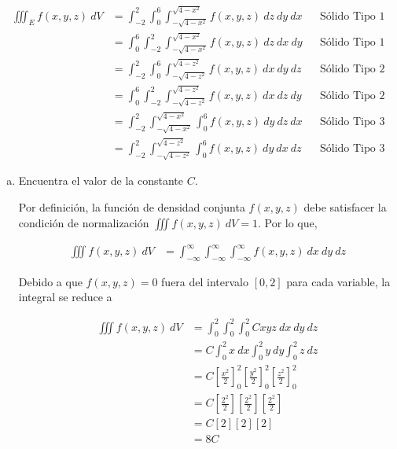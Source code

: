 \documentclass[12pt]{exam}
\begin{document}
\begin{questions}
  \begin{align*}
    \iiint_E f(x,y,z) ~ dV
    &= \int_{-2}^2 \int_0^6 \int_{-\sqrt{4-x^2}}^{\sqrt{4-x^2}} f(x,y,z) ~ dz ~ dy ~ dx  && \text{Sólido Tipo 1} \\
    &= \int_0^6 \int_{-2}^2 \int_{-\sqrt{4-x^2}}^{\sqrt{4-x^2}} f(x,y,z) ~ dz ~ dx ~ dy  && \text{Sólido Tipo 1} \\
    &= \int_{-2}^2 \int_0^6 \int_{-\sqrt{4-z^2}}^{\sqrt{4-z^2}} f(x,y,z) ~ dx ~ dy ~ dz  && \text{Sólido Tipo 2} \\
    &= \int_0^6 \int_{-2}^2 \int_{-\sqrt{4-z^2}}^{\sqrt{4-z^2}} f(x,y,z) ~ dx ~ dz ~ dy  && \text{Sólido Tipo 2} \\
    &= \int_{-2}^2 \int_{-\sqrt{4-x^2}}^{\sqrt{4-x^2}} \int_0^6  f(x,y,z) ~ dy ~ dz ~ dx  && \text{Sólido Tipo 3} \\
    &= \int_{-2}^2 \int_{-\sqrt{4-z^2}}^{\sqrt{4-z^2}} \int_0^6 f(x,y,z) ~ dy ~ dx ~ dz  && \text{Sólido Tipo 3}
  \end{align*}


  \begin{enumerate}[(a)]
  \item Encuentra el valor de la constante $C$.

    Por definición, la función de densidad conjunta $f(x,y,z)$ debe satisfacer la condición de normalización $\iiint f(x,y,z) ~ dV = 1$. Por lo que,

    \begin{align*}
      \iiint f(x,y,z) ~ dV
      &= \int_{-\infty}^{\infty} \int_{-\infty}^{\infty} \int_{-\infty}^{\infty} f(x,y,z) ~ dx ~ dy ~ dz 
    \end{align*}

    Debido a que $f(x,y,z) = 0$ fuera del intervalo $[0,2]$ para cada variable, la integral se reduce a

    \begin{align*}
      \iiint f(x,y,z) ~ dV
      &= \int_0^2 \int_0^2 \int_0^2 Cxyz ~ dx ~ dy ~ dz \\
      &= C \int_0^2 x ~ dx \int_0^2 y ~ dy \int_0^2 z ~ dz \\
      &= C \left[ \frac{x^2}{2} \right]_0^2 \left[ \frac{y^2}{2} \right]_0^2 \left[ \frac{z^2}{2} \right]_0^2 \\
      &= C \left[ \frac{2^2}{2} \right] \left[ \frac{2^2}{2} \right] \left[ \frac{2^2}{2} \right] \\
      &= C \left[ 2 \right] \left[ 2 \right] \left[ 2 \right] \\
      &= 8C
    \end{align*}


\end{enumerate}
\end{questions}
\end{document}
